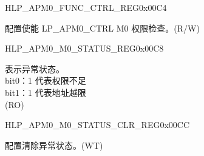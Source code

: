 \begin{register}{H}{LP\_APM0\_FUNC\_CTRL\_REG}{0x00C4}\label{regdesc:LPAPM0FUNCCTRLREG}
%
%
\regnewline%
\begin{regdesc}\begin{reglist}
\label{fielddesc:LPAPM0M0FUNCEN}\item [LP\_APM0\_M0\_FUNC\_EN] 配置使能 LP\_APM0\_CTRL M0 权限检查。(R/W)
\end{reglist}\end{regdesc}
\end{register}


\begin{register}{H}{LP\_APM0\_M0\_STATUS\_REG}{0x00C8}\label{regdesc:LPAPM0M0STATUSREG}
%
%
\regnewline%
\begin{regdesc}\begin{reglist}
\label{fielddesc:LPAPM0M0EXCEPTIONSTATUS}\item [LP\_APM0\_M0\_EXCEPTION\_STATUS] 表示异常状态。\\
bit0：1 代表权限不足 \\
bit1：1 代表地址越限  \\ (RO)
\end{reglist}\end{regdesc}
\end{register}


\begin{register}{H}{LP\_APM0\_M0\_STATUS\_CLR\_REG}{0x00CC}\label{regdesc:LPAPM0M0STATUSCLRREG}
%
%
\regnewline%
\begin{regdesc}\begin{reglist}
\label{fielddesc:LPAPM0M0EXCEPTIONSTATUSCLR}\item [LP\_APM0\_M0\_EXCEPTION\_STATUS\_CLR] 配置清除异常状态。(WT)
\end{reglist}\end{regdesc}
\end{register}


